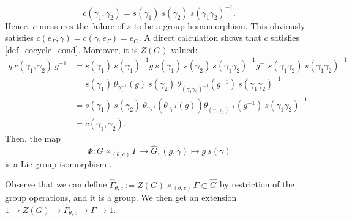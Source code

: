 \[
 c(\gamma_1, \gamma_2)= s(\gamma_1) \ s(\gamma_2) \ s(\gamma_1 \gamma_2)^{-1}.
\]
Hence, \(c\) measures the failure of \(s\) to be a group homomorphism. This obviously satisfies \(c(e_\Gamma, \gamma)=c(\gamma, e_\Gamma)=e_G\). A direct calculation shows that \(c\) satisfies \eqref{def_cocycle_cond}. Moreover, it is \(Z(G)\)-valued:
\begin{align*}
    g \ c(\gamma_1, \gamma_2) \ g^{-1} & = s(\gamma_1) \ s(\gamma_1)^{-1} g\  s(\gamma_1) \ s(\gamma_2) \ s(\gamma_1 \gamma_2)^{-1} g^{-1} s(\gamma_1 \gamma_2) \ s(\gamma_1 \gamma_2)^{-1} \\
    & = s(\gamma_1) \ \theta_{\gamma_1^{-1}}(g)\  s(\gamma_2) \  \theta_{(\gamma_1 \gamma_2)^{-1}}(g^{-1})\  s(\gamma_1 \gamma_2)^{-1} \\
    & = s(\gamma_1) \ s(\gamma_2) \ \theta_{\gamma_2^{-1}}(\theta_{\gamma_1^{-1}}(g)) \theta_{(\gamma_1 \gamma_2)^{-1}}(g^{-1})\  s(\gamma_1 \gamma_2)^{-1}\\&=c(\gamma_1, \gamma_2).
\end{align*}
Then, the map 
\begin{equation} \label{eq_def_isomorp}
\Phi\colon G \times_{(\theta, c)} \Gamma \longrightarrow \hat{G}, (g, \gamma) \mapsto g\ s(\gamma) 
\end{equation}
is a Lie group isomorphism \parencite[Remark 18.1.8]{hilgert2011structure}. 

\begin{obs}
    Observe that we can define \(\hat{\Gamma}_{\theta, c}:=Z(G)\times_{(\theta, c)} \Gamma \subset \hat{G}\) by restriction of the group operations, and it is a group. We then get an extension \(1 \to Z(G) \to \hat{\Gamma}_{\theta, c} \to \Gamma \to 1\).
\end{obs}

